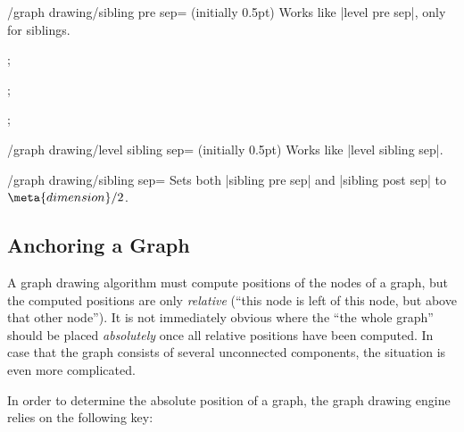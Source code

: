 \begin{key}{/graph drawing/sibling pre sep= (initially 0.5pt)}
  Works like |level pre sep|, only for siblings.
\begin{codeexample}[]
\tikz {};  
\end{codeexample}
\begin{codeexample}[]
\tikz {};  
\end{codeexample}
\begin{codeexample}[]
\tikz {};  
\end{codeexample}
\end{key}

\begin{key}{/graph drawing/level sibling sep= (initially 0.5pt)}
  Works like |level sibling sep|.
\end{key}

\begin{key}{/graph drawing/sibling sep=}
  Sets both |sibling pre sep| and |sibling post sep| to
  $\meta{dimension}/2$.
\end{key}





\subsection{Anchoring a Graph}

\label{subsection-library-graphdrawing-anchoring}

A graph drawing algorithm must compute positions of the nodes of a
graph, but the computed positions are only \emph{relative} (``this
node is left of this node, but above that other node''). It is not
immediately obvious where the ``the whole graph'' should be placed
\emph{absolutely} once all relative positions have been computed. In
case that the graph consists of several unconnected components, the
situation is even more complicated.

In order to determine the absolute position of a graph, the graph
drawing engine relies on the following key:

